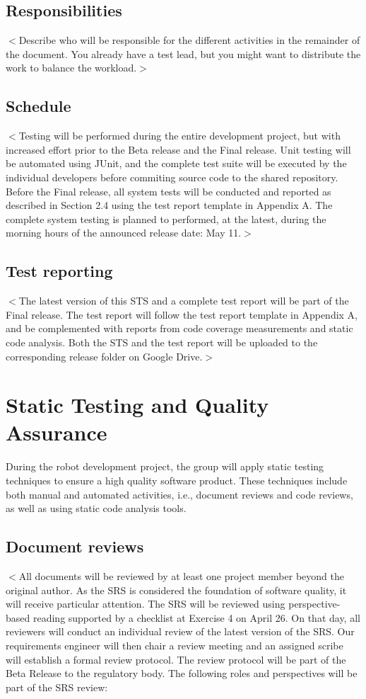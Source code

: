 \documentclass{scrreprt}
\begin{document}
\section{Responsibilities}
$<$Describe who will be responsible for the different activities in the remainder of the document. You already have a test lead, but you might want to distribute the work to balance the workload.$>$

\section{Schedule}
$<$Testing will be performed during the entire development project, but with increased effort prior to the Beta release and the Final release. Unit testing will be automated using JUnit, and the complete test suite will be executed by the individual developers before commiting source code to the shared repository. Before the Final release, all system tests will be conducted and reported as described in Section 2.4 using the test report template in Appendix A. The complete system testing is planned to performed, at the latest, during the morning hours of the announced release date: May 11.$>$

\section{Test reporting}
$<$The latest version of this STS and a complete test report will be part of the Final release. The test report will follow the test report template in Appendix A, and be complemented with reports from code coverage measurements and static code analysis. Both the STS and the test report will be uploaded to the corresponding release folder on Google Drive.$>$

\chapter{Static Testing and Quality Assurance}
During the robot development project, the group will apply static testing techniques to ensure a high quality software product. These techniques include both manual and automated activities, i.e., document reviews and code reviews, as well as using static code analysis tools.

\section{Document reviews}
$<$All documents will be reviewed by at least one project member beyond the original author. As the SRS is considered the foundation of software quality, it will receive particular attention. The SRS will be reviewed using perspective-based reading supported by a checklist at Exercise 4 on April 26. On that day, all reviewers will conduct an individual review of the latest version of the SRS. Our requirements engineer will then chair a review meeting and an assigned scribe will establish a formal review protocol. The review protocol will be part of the Beta Release to the regulatory body. The following roles and perspectives will be part of the SRS review: 
\end{document}
